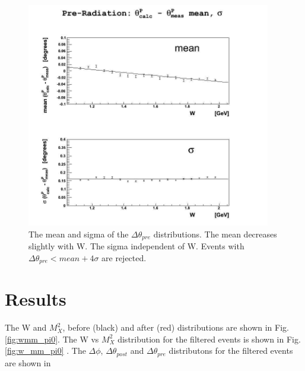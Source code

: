\begin{figure}[ht]
	\centering
		\includegraphics[width=0.95\textwidth]{img/dth2_fits.jpg}
		\caption{The mean and sigma of the $\Delta\theta_{pre}$ distributions. The mean decreases
		slightly with W. The sigma independent of W. Events with $\Delta\theta_{pre} < mean + 4\sigma$
		are rejected.}
	\label{fig:dth2_fits}
\end{figure}

\clearpage\newpage
\section{Results}
The W and $M_X^2$,  before (black) and after (red) distributions are shown in Fig. \ref{fig:wmm_pi0}.
The W vs $M_X^2$ distribution for the filtered events is shown in   Fig. \ref{fig:w_mm_pi0} . The $\Delta\phi$, $\Delta\theta_{post}$ 
and $\Delta\theta_{pre}$ distributons for the filtered events are shown in 

